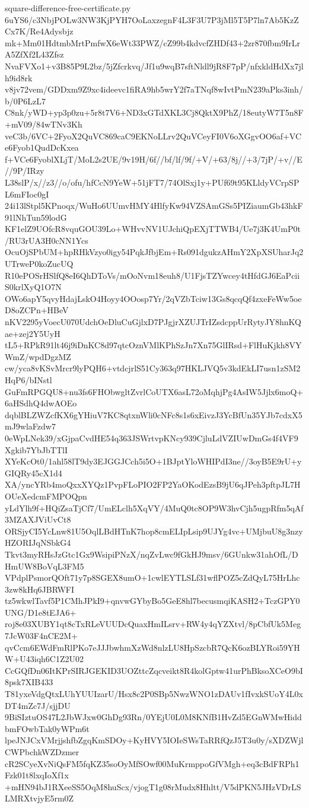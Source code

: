 \documentclass[11pt]{article}
\theoremstyle{definition}
\theoremstyle{remark}
\begin{document}
\begin{filecontents*}[overwrite]{square-difference-free-certificate.py}
6uYS6/c3NbjPOLw3NW3KjPYH7OoLaxzegnF4L3F3U7P3jMl5T5P7ln7Ab5KzZCx7K/Re4Adysbjz
mk+Mm01HdtmbMrtPmfwX6eWt33PWZ/cZ99b4kdvcfZHDf43+2zr870fbm9IrLrA5ZfXf2L43Zfsz
NvaFVXo1+v3B85P9L2bz/5jZfcrkvq/Jf1u9wqB7sftNldl9jR8F7pP/nfxkldHdXx7jlh9id8rk
v8jv72vem/GDDxm9Z9xc4ideevc1fiRA9hb5wrY2f7aTNqf8wIvtPmN239aPks3inh/b/0P6LzL7
C8nk/yWD+yp3p0zu+5r8t7V6+ND3xGTdXKL3Cj8QktX9PhZ/18eutyW7T5n8F+mV09/84wTNv3Kh
veC3b/6VC+2FyoX2QuVC869caC9EKNoLLrv2QuVCeyFI0V6oXGgvOO6af+VCe6Fyob1QudDcKxea
f+VCe6FyoblXLjT/MoL2s2UE/9v19H/6f//bf/lf/9f/+V/+63/8j//+3/7jP/+v//E//9P/IRzy
L38slP/x//z3//o/ofu/hfCcN9YeW+51jFT7/74OlSxj1y+PUf69t95KLldyVCrpSPL6mFIoc0gI
24i13lStpl5KPnoqx/WuHo6UUmvHMY4HlfyKw94VZSAmGSs5PIZiaumGb43hkF91lNhTun59lodG
KF1elZ9UOfcR8vquGOU39Lo+WHvvNV1UJchiQpEXjTTWB4/Ue7j3K4UmP0t/RU3rUA3H0cNN1Ycs
OcuOjSPbUM+hpRHkVzyo0igy54PqkJfbjEm+Rs091dgukzAHmY2XpXSUharJq2UTrweP0koZucUQ
R10ePOSrHSlfQ8eI6QhDToVs/mOoNvm18euh8/U1FjsTZYwcey4tHfdGJ6EaPciiS0krlXyQ1O7N
OWo6apY5qvyHdajLskO4Hoyy4OOosp7Yr/2qVZbTciw13Gs8qcqQf4zxeFeWw5oeD8oZCPn+HBeV
nKV2295yVoecU070UdchOeDluCuGjlxD7PJgjrXZUJTrIZsdcppUrRytyJY8hnKQae+zej2Y5UyH
tL5+RPkR91lt46j9iDnKC8d97qtcOznVMlKPhSzJn7Xn75GlIRsd+FlHuKjkh8VYWmZ/wpdDgzMZ
cw/yca8vKSvMrcr9lyPQH6+vtdcjrlS51Cy363q97HKLJVQ5v3kdEkLI7usn1zSM2HqP6/bINstl
GuFmRPGQU8+nu3fs6FHObwgltZvrlCoUTX6asL72oMqhjPg4AsIW5Jjlx6moQ+6aHSdhQ4dwAOEo
dqblBLZWZcfKX6gYHiuV7KC8qtxnWli0cNFc8s1s6xEivzJ3YcBfUn35YJb7cdxX5mJ9wlaFzdw7
0eWpLNek39/xGjpaCvdHE54q363JSWrtvpKNcy939CjluLdVZIUwDmGs4f4VF9Xgkib7YbJbTTlI
XYeKcOt0/1ahl58lT9dy3EJGGJCch5i5O+1BJptYloWHIPdI3ne//3oyB5E9rU+yGIQRy45cX1d4
XA/yncYRb4moQxxXYQz1PvpFLoPIO2FP2YaOKodEzsB9jU6qJPeh3pftpJL7HOUeXedcmFMPOQpn
yLdYlh9f+HQiZsaTjCf7/UmELclh5XqVY/4MuQ0tc8OP9W3hvCjh5ugpRfm5qAf3MZAXJViUvCt8
ORSjyCI5YcLnw81U5OqlLBdHTnK7hop8cmELIpLsip9UJYg4vc+UMjbuU8g3nzyHZORIJqNSbkG4
Tkvt3myRHsJzGtc1Gx9WsipiPNzX/nqZvLwc9fGkHJ9msv/6GUnkw31ahOfL/DHmUW8BoVqL3FM5
VPdplPsmorQOft71y7p8SGEX8umO+1cwlEYTLSLf31wflPOZ5cZdQyL75HrLhc3zw8kHq6JBRWFI
tz5wkwlTavf5P1CMhJPkI9+qnvwGYbyBo5GeE8hl7becusmqiKASH2+TczGPY0UNG/D1e8tEJA6+
roj8e03XUBY1qt8cTxRLeVUUDcQuaxHmILsrv+RW4y4qYZXtvl/8pCbfUk5Meg7JcW03F4nCE2M+
qvCcm6EWdFmRlPKo7eJJJbwhmXzWd8nlzLU8HpSzcbR7QcK6ozBLYRoi59YHW+U43iqh6C1Z2U02
CcGQfDn06ItKPrSIRJGEKID3UOZttcZqcveikt8R4kolGptw41urPhBksoXCeO9bI8psk7XIB433
T81yxeVdgQtxLUhYUUIzarU/Hsx8c2P0SBp5NwzWNO1zDAUv1fIvxkSUoY4L0xDT4mZc7J/sjjDU
9BiSIztuOS47L2JbWJxw0GhDg93Rn/0YEjU0L0M8KNfB1HvZd5EGnWMwHiddbmFOwbTak0yWPm6t
lpeJNJCxVMrjjshfbZgqKmSDOy+KyHVY5IOIeSWsTaRRfQzJ5T3u0y/sXDZWjlCWPbchkWZDzmer
cR2SCyeXvNiQsFM5fqKZ35soOyMfSOwf00MuKrmppoGfVMgh+eq3cBdFRPh1Fzk01t8lxqIoXf1x
+mHN94bJ1RXeeSS5OqM8huScx/vjogT1g08rMudx8Hhltt/V5dPKN5JHzVDrLSLMRXtvjyE5rm0Z

\end{filecontents*}
\end{document}
